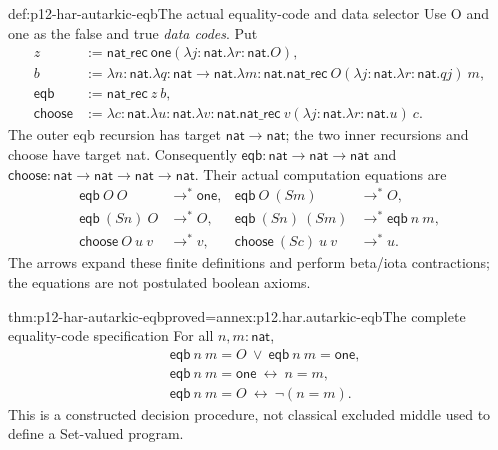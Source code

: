 \begin{hbdefinition}{def:p12-har-autarkic-eqb}{The actual equality-code and data selector}
Use O and one as the false and true \emph{data codes}. Put
\[
\begin{aligned}
 z&:=\mathsf{nat\_rec}\ \mathsf{one}
       (\lambda j:\mathsf{nat}.\lambda r:\mathsf{nat}.O),\\
 b&:=\lambda n:\mathsf{nat}.\lambda q:\mathsf{nat}\to\mathsf{nat}.
       \lambda m:\mathsf{nat}.
          \mathsf{nat\_rec}\ O
            (\lambda j:\mathsf{nat}.\lambda r:\mathsf{nat}.q j)\ m,\\
 \mathsf{eqb}&:=\mathsf{nat\_rec}\ z\ b,\\
 \mathsf{choose}&:=\lambda c:\mathsf{nat}.\lambda u:\mathsf{nat}.
  \lambda v:\mathsf{nat}.
    \mathsf{nat\_rec}\ v
       (\lambda j:\mathsf{nat}.\lambda r:\mathsf{nat}.u)\ c.
\end{aligned}
\]
The outer eqb recursion has target \(\mathsf{nat}\to\mathsf{nat}\);
the two inner recursions and choose have target nat. Consequently
\(\mathsf{eqb}:\mathsf{nat}\to\mathsf{nat}\to\mathsf{nat}\) and
\(\mathsf{choose}:\mathsf{nat}\to\mathsf{nat}\to\mathsf{nat}\to\mathsf{nat}\).
Their actual computation equations are
\[
\begin{aligned}
 \mathsf{eqb}\ O\ O&\longrightarrow^*\mathsf{one},&
 \mathsf{eqb}\ O\ (S m)&\longrightarrow^*O,\\
 \mathsf{eqb}\ (S n)\ O&\longrightarrow^*O,&
 \mathsf{eqb}\ (S n)\ (S m)&\longrightarrow^*\mathsf{eqb}\ n\ m,\\
 \mathsf{choose}\ O\ u\ v&\longrightarrow^*v,&
 \mathsf{choose}\ (S c)\ u\ v&\longrightarrow^*u.
\end{aligned}
\]
The arrows expand these finite definitions and perform beta/iota
contractions; the equations are not postulated boolean axioms.
\end{hbdefinition}

\begin{hblemma}{thm:p12-har-autarkic-eqb}{proved=annex:p12.har.autarkic-eqb}{The complete equality-code specification}
For all \(n,m:\mathsf{nat}\),
\[
\begin{aligned}
 &\mathsf{eqb}\ n\ m=O\ \vee\ \mathsf{eqb}\ n\ m=\mathsf{one},\\
 &\mathsf{eqb}\ n\ m=\mathsf{one}\ \longleftrightarrow\ n=m,\\
 &\mathsf{eqb}\ n\ m=O\ \longleftrightarrow\ \neg(n=m).
\end{aligned}
\]
This is a constructed decision procedure, not classical excluded middle
used to define a Set-valued program.
\end{hblemma}

